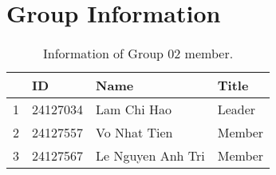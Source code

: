 \section{Group Information}
\label{sec:group-information}

\renewcommand{\arraystretch}{1.5}
\begin{table}[ht]
    \centering
    \begin{tabular}{| m{1.75cm} | m{2cm} | m{5cm}| m{2.5cm} |} 
    \hline
    \textbf{} & \textbf{ID} & \textbf{Name} & \textbf{Title} \\ 
    \hline
    1 & 24127034 & Lam Chi Hao & Leader \\ 
    \hline
    2 & 24127557 & Vo Nhat Tien & Member \\ 
    \hline
    3 & 24127567 & Le Nguyen Anh Tri & Member \\ 
    \hline
    \end{tabular}
    \caption{Information of Group 02 member.}
    \label{tab:group-information}
\end{table}